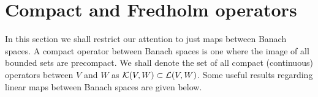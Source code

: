 \documentclass[12pt]{article}
\begin{document}
%




%    
%    

\section{Compact and Fredholm operators}
    
In this section we shall restrict our attention to just maps between Banach spaces. A compact operator between Banach spaces is one where the image of all bounded sets are precompact. We shall denote the set of all compact (continuous) operators between $V$ and $W$ as ${\cal{K}}(V, W) \subset {\cal{L}}(V, W)$. Some useful results regarding linear maps between Banach spaces are given below. 
\end{document}
